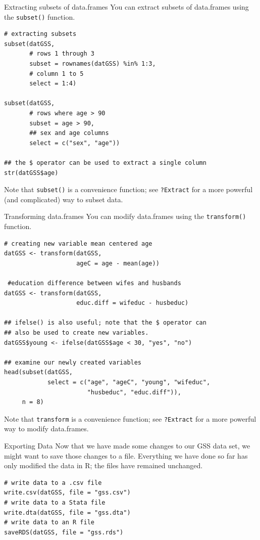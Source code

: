 \documentclass[table,smaller]{beamer}
\begin{document}
\begin{frame}[fragile,label=sec-6-4]{Extracting subsets of data.frames}
 You can extract subsets of data.frames using the \texttt{subset()} function.

\begin{verbatim}
# extracting subsets
subset(datGSS,
       # rows 1 through 3
       subset = rownames(datGSS) %in% 1:3,
       # column 1 to 5
       select = 1:4)

subset(datGSS,
       # rows where age > 90
       subset = age > 90,
       ## sex and age columns
       select = c("sex", "age"))

## the $ operator can be used to extract a single column
str(datGSS$age)
\end{verbatim}

Note that \texttt{subset()} is a convenience function; see \texttt{?Extract} for a more powerful (and complicated) way to subset data.
\end{frame}

\begin{frame}[fragile,label=sec-6-5]{Transforming data.frames}
 You can modify data.frames using the \texttt{transform()} function. 

\begin{verbatim}
# creating new variable mean centered age
datGSS <- transform(datGSS,
                    ageC = age - mean(age))

 #education difference between wifes and husbands
datGSS <- transform(datGSS,
                    educ.diff = wifeduc - husbeduc)

## ifelse() is also useful; note that the $ operator can
## also be used to create new variables.
datGSS$young <- ifelse(datGSS$age < 30, "yes", "no")

## examine our newly created variables
head(subset(datGSS,
            select = c("age", "ageC", "young", "wifeduc",
                       "husbeduc", "educ.diff")),
     n = 8)
\end{verbatim}

Note that \texttt{transform} is a convenience function; see \texttt{?Extract} for a more powerful way to modify data.frames.
\end{frame}

\begin{frame}[fragile,label=sec-6-6]{Exporting Data}
 Now that we have made some changes to our GSS data set, we might want to save those changes to a file. Everything we have done so far has only modified the data in R; the files have remained unchanged. 

\begin{verbatim}
# write data to a .csv file
write.csv(datGSS, file = "gss.csv")
# write data to a Stata file
write.dta(datGSS, file = "gss.dta")
# write data to an R file
saveRDS(datGSS, file = "gss.rds")
\end{verbatim}
\end{frame}
\end{document}
